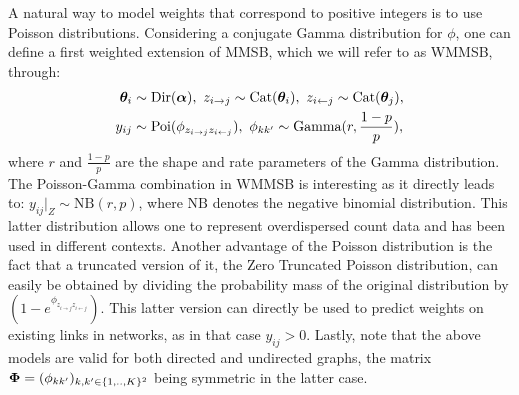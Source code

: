 A natural way to model weights that correspond to positive integers is to use Poisson distributions. Considering a conjugate Gamma distribution for $\phi$, one can define a first weighted extension of MMSB, which we will refer to as WMMSB, through:
%
\begin{align*} \label{eq:generative}
\boldsymbol{\theta}_i & \sim \textrm{Dir}(\boldsymbol{\alpha}), \,\, z_{i\rightarrow j} \sim \textrm{Cat}(\boldsymbol{\theta}_i), \,\, z_{i\leftarrow j} \sim \textrm{Cat}(\boldsymbol{\theta}_j), \\
y_{ij} &\sim \textrm{Poi}(\phi_{z_{i \rightarrow j}z_{i \leftarrow j}}), \,\, \phi_{kk'} \sim \textrm{Gamma}(r, \frac{1-p}{p}),
\end{align*}
%
where $r$ and $\frac{1-p}{p}$ are the shape and rate parameters of the Gamma distribution. The Poisson-Gamma combination in WMMSB is interesting as it directly leads to: $y_{ij}|_{Z} \sim \textrm{NB}(r,p)$, where $\textrm{NB}$ denotes the negative binomial distribution. This latter distribution allows one to represent overdispersed count data and has been used in different contexts.%
 Another advantage of the Poisson distribution is the fact that a truncated version of it, the Zero Truncated Poisson distribution, can easily be obtained by dividing the probability mass of the original distribution by $(1 - e^{\phi_{z_{i \rightarrow j}z_{i \leftarrow j}}})$. This latter version can directly be used to predict weights on existing links in networks, as in that case $y_{ij} > 0$. Lastly, note that the above models are valid for both directed and undirected graphs, the matrix $\boldsymbol{\Phi} = (\phi_{kk'})_{k,k' \in \{1,..,K\}^2}$ being symmetric in the latter case.

